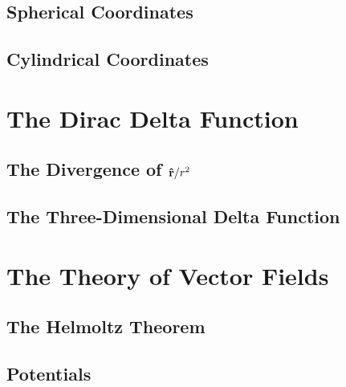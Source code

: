 \subsection{Spherical Coordinates}

\subsection{Cylindrical Coordinates}

  
\section{The Dirac Delta Function}

\subsection{The Divergence of $\vu{r}/r^2$}

\subsection{The Three-Dimensional Delta Function}
    

\section{The Theory of Vector Fields}

\subsection{The Helmoltz Theorem}

\subsection{Potentials}
        
